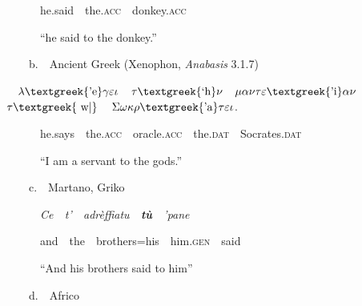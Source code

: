 \documentclass[output=paper,modfonts,nonflat]{langsci/langscibook}
\begin{document}
\begin{styleStandard}
\ \ \ \ \ \ he.said\ \ the.\textsc{acc}\ \ donkey.\textsc{acc} 
\end{styleStandard}

\begin{styleStandard}
\ \ \ \ \ \ “he said to the donkey.”
\end{styleStandard}

\begin{styleStandard}
\ \ \ \ b.\ \ Ancient Greek (Xenophon, \textit{Anabasis} 3.1.7)\ \ 
\end{styleStandard}

\begin{styleStandard}
\ \ $\lambda \text{\textgreek{'e}}\gamma \varepsilon \iota $\ \ $\tau \text{\textgreek{`h}}\nu $\ \ $\mu \alpha \nu \tau \varepsilon \text{\textgreek{'i}}\alpha \nu $\textstyleappleconvertedspace{\ \ }\textbf{$\tau \text{\textgreek{~w|}}$\ \ $\Sigma \omega \kappa \rho \text{\textgreek{'a}}\tau \varepsilon \iota $}.
\end{styleStandard}

\begin{styleStandard}
\ \ \ \ \ \ he.says\ \ the.\textsc{acc}\ \ oracle.\textsc{acc\ \ }the.\textsc{dat}\ \ Socrates.\textsc{dat}
\end{styleStandard}

\begin{styleStandard}
\ \ \ \ \ \ “I am a servant to the gods.”
\end{styleStandard}

\begin{styleStandard}
\ \ \ \ c.\ \ Martano, Griko
\end{styleStandard}

\begin{styleStandard}
\ \ \ \ \ \ \textit{Ce\ \ t’\ \ adrèffiatu\ \ }\textbf{\textit{tù}}\textit{\ \ ’pane}
\end{styleStandard}

\begin{styleStandard}
\ \ \ \ \ \ and\ \ the\ \ brothers=his\ \ him.\textsc{gen}\ \ said
\end{styleStandard}

\begin{styleStandard}
\ \ \ \ \ \ “And his brothers said to him”
\end{styleStandard}

\begin{styleStandard}
\ \ \ \ d.\ \ Africo
\end{styleStandard}
\end{document}
